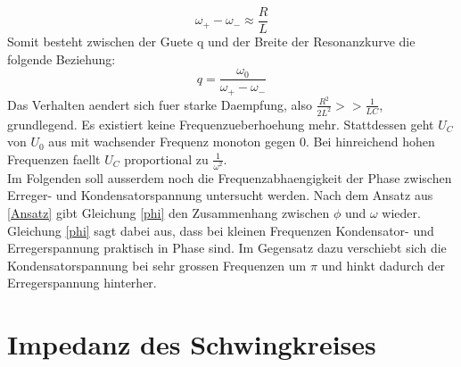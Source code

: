 \documentclass[titlepage=firstcover, captions=tableheading]{scrartcl}
\begin{document}
\begin{equation}
    \omega_+-\omega_-\approx \frac{R}{L}\nonumber
\end{equation}
Somit besteht zwischen der Guete q und der Breite der Resonanzkurve die folgende Beziehung:
\begin{equation}
    q=\frac{\omega_0}{\omega_+-\omega_-}\nonumber
\end{equation}
Das Verhalten aendert sich fuer starke Daempfung, also $\frac{R^2}{2L^2}>>\frac{1}{LC}$, grundlegend. Es existiert keine Frequenzueberhoehung mehr. Stattdessen geht $U_C$ von $U_0$ aus mit wachsender Frequenz monoton gegen 0. Bei hinreichend hohen Frequenzen faellt $U_C$ proportional zu $\frac{1}{\omega^2}$.\\
Im Folgenden soll ausserdem noch die Frequenzabhaengigkeit der Phase zwischen Erreger- und Kondensatorspannung untersucht werden. Nach dem Ansatz aus \ref{Ansatz} gibt Gleichung \ref{phi} den Zusammenhang zwischen $\phi$ und $\omega$ wieder. Gleichung \ref{phi} sagt dabei aus, dass bei kleinen Frequenzen Kondensator- und Erregerspannung praktisch in Phase sind. Im Gegensatz dazu verschiebt sich die Kondensatorspannung bei sehr grossen Frequenzen um $\pi$ und hinkt dadurch der Erregerspannung hinterher. 
\section{Impedanz des Schwingkreises}
\end{document}
